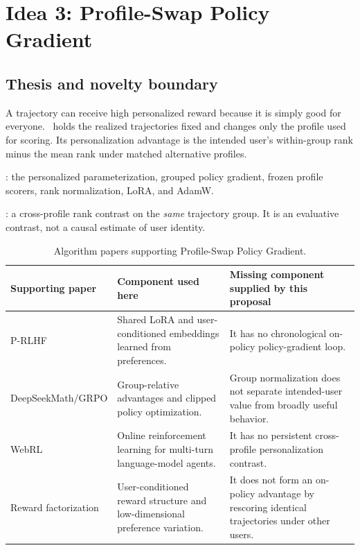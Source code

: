 \section{Idea 3: Profile-Swap Policy Gradient}
\label{sec:profile-swap}

\subsection{Thesis and novelty boundary}

A trajectory can receive high personalized reward because it is simply good
for everyone.  \profileswap\ holds the realized trajectories fixed and changes
only the profile used for scoring.  Its personalization advantage is the
intended user's within-group rank minus the mean rank under matched alternative
profiles.

\Inherited: the personalized parameterization, grouped policy gradient, frozen
profile scorers, rank normalization, LoRA, and AdamW.

\Proposed: a cross-profile rank contrast on the \emph{same} trajectory group.
It is an evaluative contrast, not a causal estimate of user identity.

\begin{table}[t]
  \centering
  \caption{Algorithm papers supporting Profile-Swap Policy Gradient.}
  \label{tab:profile-support}
  \begin{tabularx}{\textwidth}{@{}L{0.24\textwidth}Y Y@{}}
    \toprule
    Supporting paper & Component used here & Missing component supplied by this proposal \\
    \midrule
    P-RLHF \citep{li2024personalized} &
    Shared LoRA and user-conditioned embeddings learned from preferences. &
    It has no chronological on-policy policy-gradient loop. \\
    DeepSeekMath/GRPO \citep{shao2024deepseekmath} &
    Group-relative advantages and clipped policy optimization. &
    Group normalization does not separate intended-user value from broadly
    useful behavior. \\
    WebRL \citep{qi2025webrl} &
    Online reinforcement learning for multi-turn language-model agents. &
    It has no persistent cross-profile personalization contrast. \\
    Reward factorization \citep{shenfeld2025reward} &
    User-conditioned reward structure and low-dimensional preference
    variation. &
    It does not form an on-policy advantage by rescoring identical
    trajectories under other users. \\
    \bottomrule
  \end{tabularx}
\end{table}


